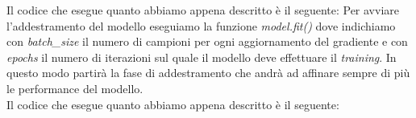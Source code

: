 \newline
Il codice che esegue quanto abbiamo appena descritto è il seguente:
\vspace*{2ex}
\vspace*{2ex}
Per avviare l'addestramento del modello eseguiamo la funzione \textit{model.fit()} dove indichiamo con \textit{batch\_size} il numero di campioni per ogni aggiornamento del gradiente e con \textit{epochs} il numero di iterazioni sul quale il modello deve effettuare il \textit{training}. In questo modo partirà la fase di addestramento che andrà ad affinare sempre di più le performance del modello.\\
\newline
Il codice che esegue quanto abbiamo appena descritto è il seguente:
\vspace*{2ex}
\vspace*{2ex}
